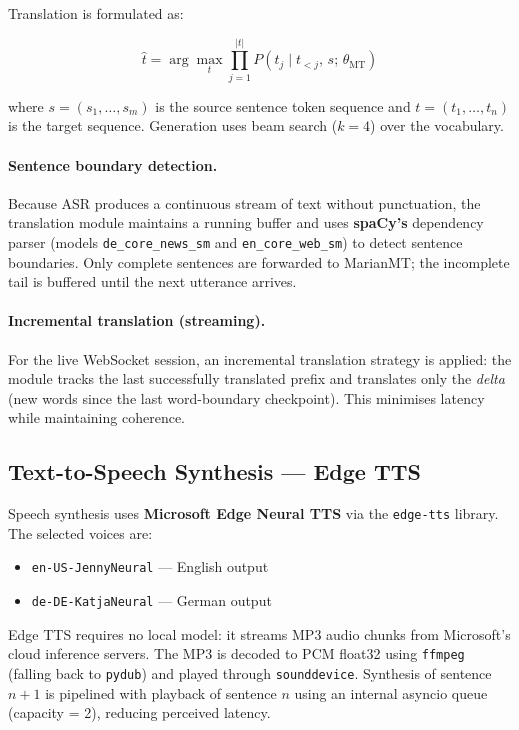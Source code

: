 \documentclass[12pt,a4paper]{report}
\begin{document}
Translation is formulated as:

\begin{equation}
  \hat{t} = \arg\max_{t} \prod_{j=1}^{|t|} P(t_j \mid t_{<j},\, s;\, \theta_\mathrm{MT})
\end{equation}

where $s = (s_1, \ldots, s_m)$ is the source sentence token sequence and
$t = (t_1, \ldots, t_n)$ is the target sequence. Generation uses beam
search ($k=4$) over the vocabulary.

\paragraph{Sentence boundary detection.}
Because ASR produces a continuous stream of text without punctuation,
the translation module maintains a running buffer and uses
\textbf{spaCy's} dependency parser (models \texttt{de\_core\_news\_sm}
and \texttt{en\_core\_web\_sm}) to detect sentence boundaries. Only
complete sentences are forwarded to MarianMT; the incomplete tail is
buffered until the next utterance arrives.

\paragraph{Incremental translation (streaming).}
For the live WebSocket session, an incremental translation strategy is
applied: the module tracks the last successfully translated prefix and
translates only the \emph{delta} (new words since the last
word-boundary checkpoint). This minimises latency while maintaining
coherence.

\subsection{Text-to-Speech Synthesis — Edge TTS}

Speech synthesis uses \textbf{Microsoft Edge Neural TTS} via the
\texttt{edge-tts} library. The selected voices are:

\begin{itemize}
  \item \texttt{en-US-JennyNeural} — English output
  \item \texttt{de-DE-KatjaNeural} — German output
\end{itemize}

Edge TTS requires no local model: it streams MP3 audio chunks from
Microsoft's cloud inference servers. The MP3 is decoded to PCM float32
using \texttt{ffmpeg} (falling back to \texttt{pydub}) and played
through \texttt{sounddevice}. Synthesis of sentence $n+1$ is pipelined
with playback of sentence $n$ using an internal asyncio queue (capacity
= 2), reducing perceived latency.
\end{document}

